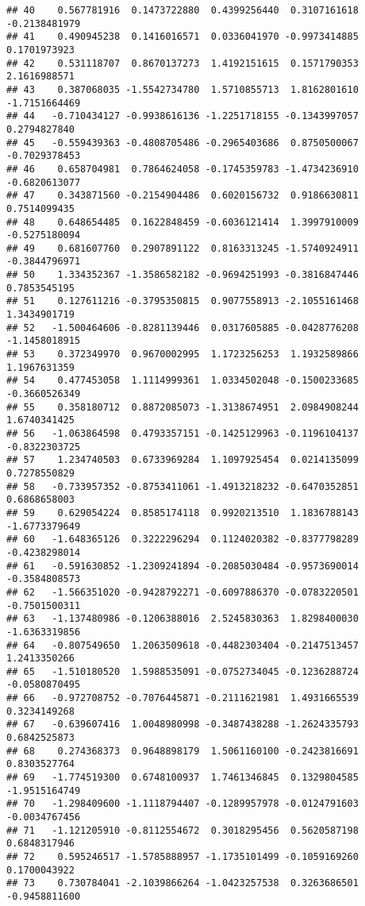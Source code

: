 \documentclass[
]{article}
\begin{document}
\begin{verbatim}
## 40    0.567781916  0.1473722880  0.4399256440  0.3107161618 -0.2138481979
## 41    0.490945238  0.1416016571  0.0336041970 -0.9973414885  0.1701973923
## 42    0.531118707  0.8670137273  1.4192151615  0.1571790353  2.1616988571
## 43    0.387068035 -1.5542734780  1.5710855713  1.8162801610 -1.7151664469
## 44   -0.710434127 -0.9938616136 -1.2251718155 -0.1343997057  0.2794827840
## 45   -0.559439363 -0.4808705486 -0.2965403686  0.8750500067 -0.7029378453
## 46    0.658704981  0.7864624058 -0.1745359783 -1.4734236910 -0.6820613077
## 47    0.343871560 -0.2154904486  0.6020156732  0.9186630811  0.7514099435
## 48    0.648654485  0.1622848459 -0.6036121414  1.3997910009 -0.5275180094
## 49    0.681607760  0.2907891122  0.8163313245 -1.5740924911 -0.3844796971
## 50    1.334352367 -1.3586582182 -0.9694251993 -0.3816847446  0.7853545195
## 51    0.127611216 -0.3795350815  0.9077558913 -2.1055161468  1.3434901719
## 52   -1.500464606 -0.8281139446  0.0317605885 -0.0428776208 -1.1458018915
## 53    0.372349970  0.9670002995  1.1723256253  1.1932589866  1.1967631359
## 54    0.477453058  1.1114999361  1.0334502048 -0.1500233685 -0.3660526349
## 55    0.358180712  0.8872085073 -1.3138674951  2.0984908244  1.6740341425
## 56   -1.063864598  0.4793357151 -0.1425129963 -0.1196104137 -0.8322303725
## 57    1.234740503  0.6733969284  1.1097925454  0.0214135099  0.7278550829
## 58   -0.733957352 -0.8753411061 -1.4913218232 -0.6470352851  0.6868658003
## 59    0.629054224  0.8585174118  0.9920213510  1.1836788143 -1.6773379649
## 60   -1.648365126  0.3222296294  0.1124020382 -0.8377798289 -0.4238298014
## 61   -0.591630852 -1.2309241894 -0.2085030484 -0.9573690014 -0.3584808573
## 62   -1.566351020 -0.9428792271 -0.6097886370 -0.0783220501 -0.7501500311
## 63   -1.137480986 -0.1206388016  2.5245830363  1.8298400030 -1.6363319856
## 64   -0.807549650  1.2063509618 -0.4482303404 -0.2147513457  1.2413350266
## 65   -1.510180520  1.5988535091 -0.0752734045 -0.1236288724 -0.0580870495
## 66   -0.972708752 -0.7076445871 -0.2111621981  1.4931665539  0.3234149268
## 67   -0.639607416  1.0048980998 -0.3487438288 -1.2624335793  0.6842525873
## 68    0.274368373  0.9648898179  1.5061160100 -0.2423816691  0.8303527764
## 69   -1.774519300  0.6748100937  1.7461346845  0.1329804585 -1.9515164749
## 70   -1.298409600 -1.1118794407 -0.1289957978 -0.0124791603 -0.0034767456
## 71   -1.121205910 -0.8112554672  0.3018295456  0.5620587198  0.6848317946
## 72    0.595246517 -1.5785888957 -1.1735101499 -0.1059169260  0.1700043922
## 73    0.730784041 -2.1039866264 -1.0423257538  0.3263686501 -0.9458811600

\end{verbatim}
\end{document}
